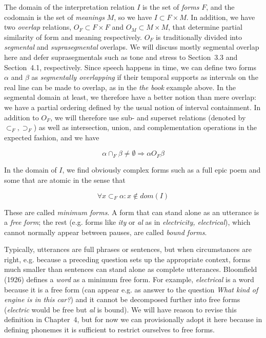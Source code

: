 The domain of the interpretation relation $I$ is the set of {\it forms} $F$,
and the codomain is the set of {\it meanings} $M$, so we have $I \subset F
\times M$. In addition, we have two {\it overlap} relations, $O_F \subset F
\times F $ and $O_M \subset M \times M$, that determine partial similarity of
form and meaning respectively. $O_F$ is traditionally divided into {\it
  segmental} and {\it suprasegmental} overlaps. We will discuss mostly
segmental overlap here and defer suprasegmentals such as tone and stress to
Section~3.3 and Section~4.1, respectively. Since speech happens in time, we
can define two forms $\alpha$ and $\beta$ as {\it segmentally overlapping} if
their temporal supports as intervals on the real line can be made to overlap,
as in the {\it the book} example above. In the segmental domain at least, we
therefore have a better notion than mere overlap: we have a partial ordering
defined by the usual notion of interval containment. In addition to $O_F$, we
will therefore use sub- and superset relations (denoted by $\subset_F,
\supset_F$) as well as intersection, union, and complementation operations in
the expected fashion, and we have

\begin{equation} 
\alpha \cap_F \beta \neq \emptyset \Rightarrow \alpha O_F \beta
\end{equation}

In the domain of $I$, we find obviously complex forms such as a full epic poem
and some that are atomic in the sense that 

\begin{equation}
\forall x \subset_F \alpha : x \not\in dom(I)
\end{equation}

\noindent
These are called {\it minimum forms}.  A form that can
stand alone as an utterance is a {\it free form}; the rest
(e.g. forms like {\it ity} or {\it al} as in {\it electricity, electrical}),
which cannot normally appear between pauses, are called {\it bound
  forms}. 

Typically, utterances are full phrases or sentences, but when circumstances
are right, e.g. because a preceding question sets up the appropriate context,
forms much smaller than sentences can stand alone as complete utterances.
Bloomfield (1926) defines a {\it word} as a minimum free form. For example,
{\it electrical} is a word because it is a free form (can appear e.g. as
answer to the question {\it What kind of engine is in this car?}) and it cannot
be decomposed further into free forms ({\it electric} would be free but {\it
al} is bound). We will have reason to revise this definition in Chapter~4, but
for now we can provisionally adopt it here because in
defining phonemes it is sufficient to restrict ourselves to free forms. 

